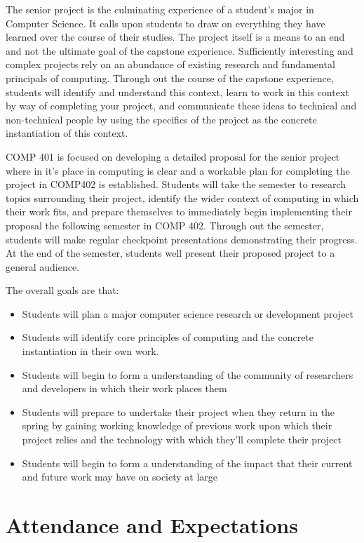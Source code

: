 \documentclass[10pt]{article}
\begin{document}
The senior project is the culminating experience of a student's major in Computer Science.  It calls upon students to draw on everything they have learned over the course of their studies. The project itself is a means to an end and not the ultimate goal of the capstone experience. Sufficiently interesting and complex projects rely on an abundance of existing research and fundamental principals of computing.  Through out the course of the capstone experience, students will identify and understand this context, learn to work in this context by way of completing your project, and communicate these ideas to technical and non-technical people by using the specifics of the project as the concrete instantiation of this context. 

COMP 401 is focused on developing a detailed proposal for the senior project where in it's place in computing is clear and a workable plan for completing the project in COMP402 is established. Students will take the semester to research topics surrounding their project, identify the wider context of computing in which their work fits, and prepare themselves to immediately begin implementing their proposal the following semester in COMP 402.  Through out the semester, students will make regular checkpoint presentations demonstrating their progress.  At the end of the semester, students well present their proposed project to a general audience.

The overall goals are that:
\begin{itemize}
\item Students will plan a major computer science research or development project
\item Students will identify core principles of computing and the concrete instantiation in their own work.
\item Students will begin to form a understanding of the community of researchers and developers in which their work places them
\item Students will prepare to undertake their project when they return in the spring by gaining working knowledge of previous work upon which their project relies and the technology with which they'll complete their project
\item Students will begin to form a understanding of the impact that their current and future work may have on society at large 
\end{itemize}


\section{Attendance and Expectations}
\end{document}
